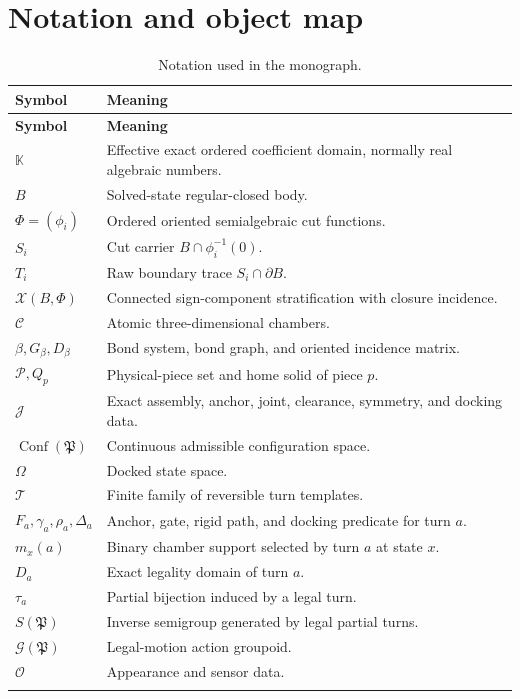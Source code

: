 \documentclass[11pt,openany]{book}
\newcommand{\K}{\mathbb K}
\newcommand{\Conf}{\operatorname{Conf}}
\newcommand{\Atlas}{\mathfrak P}
\newcommand{\Strat}{\mathscr X}
\newcommand{\Pieces}{\mathscr P}
\newcommand{\States}{\Omega}
\newcommand{\Turns}{\mathcal T}
\theoremstyle{polyplain}
\theoremstyle{polydef}
\begin{document}
\appendix

\chapter{Notation and object map}

\begin{longtable}{L{0.18\textwidth}L{0.72\textwidth}}
\toprule
\textbf{Symbol} & \textbf{Meaning}\\
\midrule
\endfirsthead
\toprule
\textbf{Symbol} & \textbf{Meaning}\\
\midrule
\endhead
$\K$ & Effective exact ordered coefficient domain, normally real algebraic numbers.\\
$B$ & Solved-state regular-closed body.\\
$\Phi=(\phi_i)$ & Ordered oriented semialgebraic cut functions.\\
$S_i$ & Cut carrier $B\cap\phi_i^{-1}(0)$.\\
$T_i$ & Raw boundary trace $S_i\cap\partial B$.\\
$\Strat(B,\Phi)$ & Connected sign-component stratification with closure incidence.\\
$\mathcal C$ & Atomic three-dimensional chambers.\\
$\beta,G_\beta,D_\beta$ & Bond system, bond graph, and oriented incidence matrix.\\
$\Pieces,Q_p$ & Physical-piece set and home solid of piece $p$.\\
$\mathcal J$ & Exact assembly, anchor, joint, clearance, symmetry, and docking data.\\
$\Conf(\Atlas)$ & Continuous admissible configuration space.\\
$\States$ & Docked state space.\\
$\Turns$ & Finite family of reversible turn templates.\\
$F_a,\gamma_a,\rho_a,\Delta_a$ & Anchor, gate, rigid path, and docking predicate for turn $a$.\\
$m_x(a)$ & Binary chamber support selected by turn $a$ at state $x$.\\
$D_a$ & Exact legality domain of turn $a$.\\
$\tau_a$ & Partial bijection induced by a legal turn.\\
$S(\Atlas)$ & Inverse semigroup generated by legal partial turns.\\
$\mathcal G(\Atlas)$ & Legal-motion action groupoid.\\
$\mathcal O$ & Appearance and sensor data.\\
\bottomrule
\caption{Notation used in the monograph.}
\end{longtable}
\end{document}
